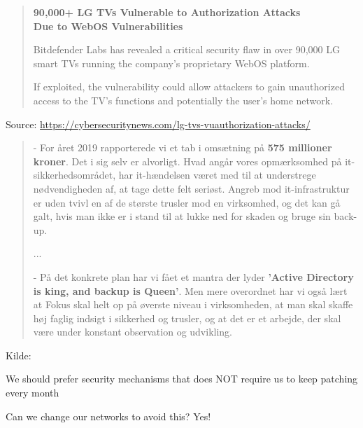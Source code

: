 \documentclass[Screen16to9,17pt]{foils}
\begin{document}


\begin{quote}{\large\bf
90,000+ LG TVs Vulnerable to Authorization Attacks\\
Due to WebOS Vulnerabilities}

Bitdefender Labs has revealed a critical security flaw in over 90,000 LG smart TVs running the company’s proprietary WebOS platform.

If exploited, the vulnerability could allow attackers to gain unauthorized access to the TV’s functions and potentially the user’s home network.

\end{quote}
Source: \url{https://cybersecuritynews.com/lg-tvs-vuauthorization-attacks/}





\begin{quote}
- For året 2019 rapporterede vi et tab i omsætning på {\bf 575 millioner kroner}. Det i sig selv er alvorligt. Hvad angår vores opmærksomhed på it-sikkerhedsområdet, har it-hændelsen været med til at understrege nødvendigheden af, at tage dette felt seriøst. Angreb mod it-infrastruktur er uden tvivl en af de største trusler mod en virksomhed, og det kan gå galt, hvis man ikke er i stand til at lukke ned for skaden og bruge sin back-up.

...

- På det konkrete plan har vi fået et mantra der lyder {\bf ’Active Directory is king, and backup is Queen’}. Men mere overordnet har vi også lært at Fokus skal helt op på øverste niveau i virksomheden, at man skal skaffe høj faglig indsigt i sikkerhed og trusler, og at det er et arbejde, der skal være under konstant observation og udvikling.

\end{quote}
Kilde: 




\begin{list2}
\item We should prefer security mechanisms that does NOT require us to keep patching every month
\item Can we change our networks to avoid this? Yes!
\end{list2}
\end{document}
